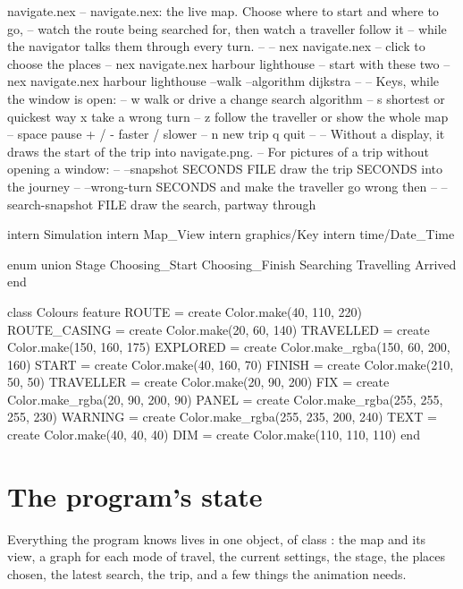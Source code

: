 \begin{newfile}{navigate.nex}
-- navigate.nex: the live map. Choose where to start and where to go,
-- watch the route being searched for, then watch a traveller follow it
-- while the navigator talks them through every turn.
--
--   nex navigate.nex                        -- click to choose the places
--   nex navigate.nex harbour lighthouse     -- start with these two
--   nex navigate.nex harbour lighthouse --walk --algorithm dijkstra
--
-- Keys, while the window is open:
--   w        walk or drive              a        change search algorithm
--   s        shortest or quickest way   x        take a wrong turn
--   z        follow the traveller or show the whole map
--   space    pause                      + / -    faster / slower
--   n        new trip                   q        quit
--
-- Without a display, it draws the start of the trip into navigate.png.
-- For pictures of a trip without opening a window:
--   --snapshot SECONDS FILE   draw the trip SECONDS into the journey
--   --wrong-turn SECONDS      and make the traveller go wrong then
--   --search-snapshot FILE    draw the search, partway through

intern Simulation
intern Map_View
intern graphics/Key
intern time/Date_Time

enum union Stage
  Choosing_Start
  Choosing_Finish
  Searching
  Travelling
  Arrived
end

class Colours
feature
  ROUTE = create Color.make(40, 110, 220)
  ROUTE_CASING = create Color.make(20, 60, 140)
  TRAVELLED = create Color.make(150, 160, 175)
  EXPLORED = create Color.make_rgba(150, 60, 200, 160)
  START = create Color.make(40, 160, 70)
  FINISH = create Color.make(210, 50, 50)
  TRAVELLER = create Color.make(20, 90, 200)
  FIX = create Color.make_rgba(20, 90, 200, 90)
  PANEL = create Color.make_rgba(255, 255, 255, 230)
  WARNING = create Color.make_rgba(255, 235, 200, 240)
  TEXT = create Color.make(40, 40, 40)
  DIM = create Color.make(110, 110, 110)
end
\end{newfile}

\section{The program's state}

Everything the program knows lives in one object, of class : the
map and its view, a graph for each mode of travel, the current settings,
the stage, the places chosen, the latest search, the trip, and a few things
the animation needs.

